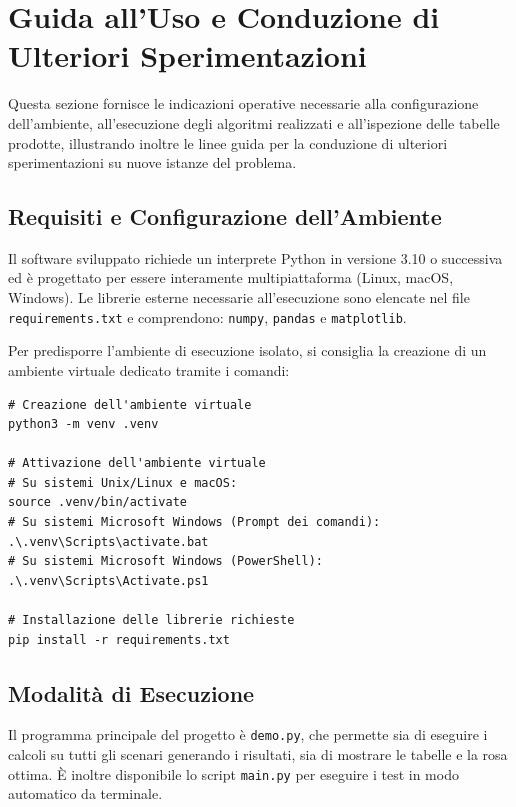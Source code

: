 \section{Guida all'Uso e Conduzione di Ulteriori Sperimentazioni}

Questa sezione fornisce le indicazioni operative necessarie alla configurazione dell'ambiente, all'esecuzione degli algoritmi realizzati e all'ispezione delle tabelle prodotte, illustrando inoltre le linee guida per la conduzione di ulteriori sperimentazioni su nuove istanze del problema.

\subsection{Requisiti e Configurazione dell'Ambiente}
Il software sviluppato richiede un interprete Python in versione 3.10 o successiva ed è progettato per essere interamente multipiattaforma (Linux, macOS, Windows). Le librerie esterne necessarie all'esecuzione sono elencate nel file \texttt{requirements.txt} e comprendono: \texttt{numpy}, \texttt{pandas} e \texttt{matplotlib}.

Per predisporre l'ambiente di esecuzione isolato, si consiglia la creazione di un ambiente virtuale dedicato tramite i comandi:
\begin{verbatim}
# Creazione dell'ambiente virtuale
python3 -m venv .venv

# Attivazione dell'ambiente virtuale
# Su sistemi Unix/Linux e macOS:
source .venv/bin/activate
# Su sistemi Microsoft Windows (Prompt dei comandi):
.\.venv\Scripts\activate.bat
# Su sistemi Microsoft Windows (PowerShell):
.\.venv\Scripts\Activate.ps1

# Installazione delle librerie richieste
pip install -r requirements.txt
\end{verbatim}

\subsection{Modalità di Esecuzione}
Il programma principale del progetto è \texttt{demo.py}, che permette sia di eseguire i calcoli su tutti gli scenari generando i risultati, sia di mostrare le tabelle e la rosa ottima. È inoltre disponibile lo script \texttt{main.py} per eseguire i test in modo automatico da terminale.

